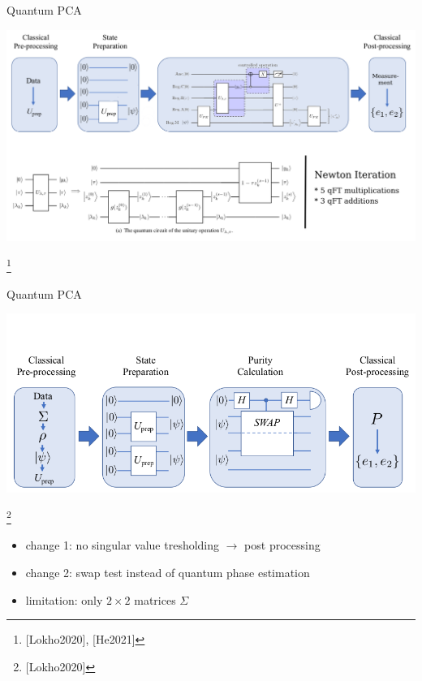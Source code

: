 \begin{frame}{Quantum PCA}
  \begin{minipage}{1.0\textwidth}
    \centering
    \includegraphics[width=\textwidth]{../assets/context_algorithm_main-3.png}
  \end{minipage}
  \footnote{[Lokho2020], [He2021]}
\end{frame}


\begin{frame}{Quantum PCA}
  \begin{minipage}{1.0\textwidth}
    \centering
    \includegraphics[width=\textwidth]{../assets/context_algorithm_main-ref19.png}
  \end{minipage}
  \footnote{[Lokho2020]}
  \hfill
  \begin{minipage}{1.0\textwidth}
    \begin{itemize}
      \item change 1: no singular value tresholding $\rightarrow$ post processing
      \item change 2: swap test instead of quantum phase estimation
      \item limitation: only $2 \times 2$ matrices $\Sigma$
    \end{itemize}
  \end{minipage}
\end{frame}
